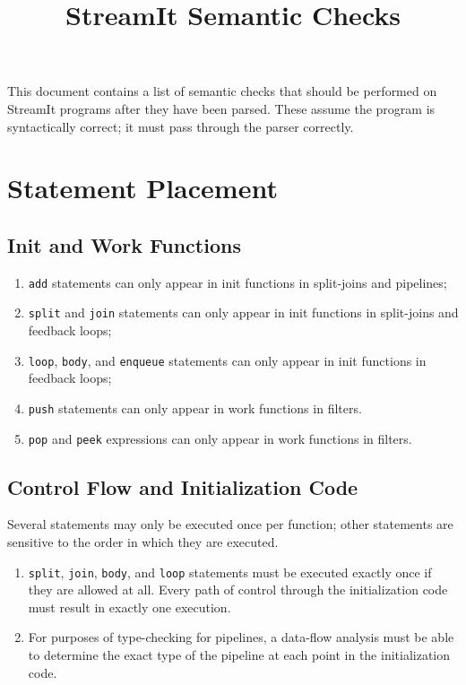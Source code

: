 \documentclass[11pt]{article}
\title{StreamIt Semantic Checks}
\begin{document}
\maketitle

This document contains a list of semantic checks that should be
performed on StreamIt programs after they have been parsed.  These
assume the program is syntactically correct; it must pass through the
parser correctly.

\section{Statement Placement}

\subsection{Init and Work Functions}

\begin{enumerate}
\item \lstinline|add| statements can only appear in init functions in
  split-joins and pipelines;
\item \lstinline|split| and \lstinline|join| statements can only
  appear in init functions in split-joins and feedback loops;
\item \lstinline|loop|, \lstinline|body|, and \lstinline|enqueue|
  statements can only appear in init functions in feedback loops;
\item \lstinline|push| statements can only appear in work functions in
  filters.
\item \lstinline|pop| and \lstinline|peek| expressions can only appear
  in work functions in filters.
\end{enumerate}

\subsection{Control Flow and Initialization Code}

Several statements may only be executed once per function; other
statements are sensitive to the order in which they are executed.

\begin{enumerate}
\item \lstinline|split|, \lstinline|join|, \lstinline|body|, and
  \lstinline|loop| statements must be executed exactly once if they
  are allowed at all.  Every path of control through the
  initialization code must result in exactly one execution.
\item For purposes of type-checking for pipelines, a data-flow
  analysis must be able to determine the exact type of the pipeline at
  each point in the initialization code.
\end{enumerate}
\end{document}
